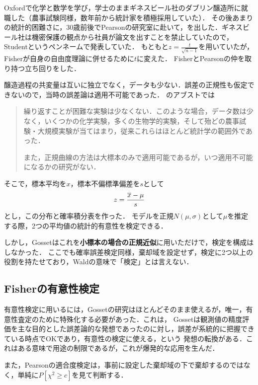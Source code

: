 \documentclass[uplatex,dvipdfmx]{jsreport}
\begin{document}
\begin{history}
    Oxfordで化学と数学を学び，学士のままギネスビール社のダブリン醸造所に就職した（農事試験同様，数年前から統計家を積極採用していた）．
    その後あまりの統計的困難さに，30歳前後でPearsonの研究室に赴いて，\cite{Gosset08}を出した．ギネスビール社は機密保護の観点から社員が論文を出すことを禁止していたので，Studentというペンネームで発表していた．
    もともと$z=\frac{t}{\sqrt{n-1}}$を用いていたが，Fisherが自身の自由度理論に併せるために$t$に変えた．
    FisherとPearsonの仲を取り持つ立ち回りをした．

    醸造過程の共変量は互いに独立でなく，データも少ない．誤差の正規性も仮定できないので，当時の誤差論は適用不可能であった．
    \cite{Gosset08}のアブストでは
    \begin{quote}
        繰り返すことが困難な実験は少なくない．このような場合，データ数は少なく，いくつかの化学実験，多くの生物学的実験，そして殆どの農事試験・大規模実験が当てはまり，従来これらはほとんど統計学の範囲外であった．

        また，正規曲線の方法は大標本のみで適用可能であるが，いつ適用不可能になるかの研究がない．
    \end{quote}
    そこで，標本平均を$x$，標本不偏標準偏差を$s$として
    \[z=\frac{\overline{x}-\mu}{s}\]
    とし，この分布と確率積分表を作った．
    モデルを正規$N(\mu,\sigma)$として$\mu$を推定する際，2つの平均値の統計的有意性を検定できる．

    しかし，Gossetはこれを\textbf{小標本の場合の正規近似}に用いただけで，検定を構成はしなかった．
    ここでも確率誤差検定同様，棄却域を設定せず，検定に2つ以上の役割を持たせており，Waldの意味で「検定」とは言えない．
\end{history}

\subsection{Fisherの有意性検定}

有意性検定に用いるには，Gossetの研究はほとんどそのまま使えるが，唯一，有意性査定のために特殊化する必要があった．これは，
Gossetは観測値の精度評価を主な目的とした誤差論的な発想であったのに対し，誤差が系統的に把握できている時点でOKであり，有意性の検定に使える，という
発想の転換がある．これはある意味で用途の制限であるが，これが爆発的な応用を生んだ．

また，Pearsonの適合度検定は，事前に設定した棄却域の下で棄却するのではなく，単純に$P[\chi^2\ge c]$を見て判断する．
\end{document}
